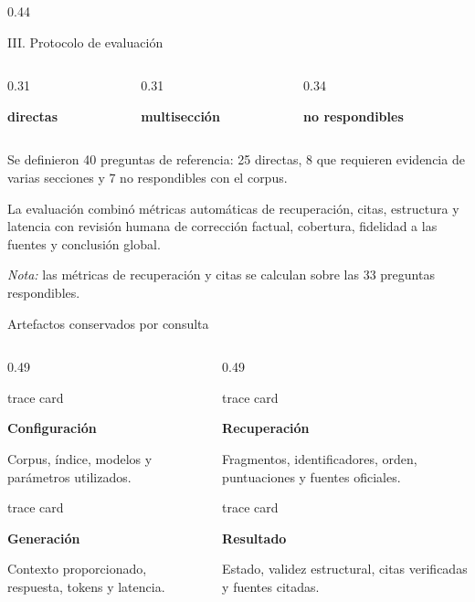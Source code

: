 \documentclass[final]{beamer}
\newcommand{\tracecard}[2]{%
  \begin{beamercolorbox}[wd=\linewidth,sep=0.42cm]{trace card}
    {\color{Navy}\bfseries\fontsize{25}{29}\selectfont #1\par}
    \vspace{0.12cm}
    {\fontsize{21}{25}\selectfont #2\par}
  \end{beamercolorbox}
}
\begin{document}
\begin{frame}[t]
\begin{columns}[T,totalwidth=\textwidth]
\begin{column}{0.44\textwidth}
\begin{block}{III. Protocolo de evaluación}
\begin{columns}[T,totalwidth=\linewidth]
  \begin{column}{0.31\linewidth}
    \centering
    {\color{Teal}\bfseries\fontsize{46}{49}\par}
    {\bfseries\fontsize{23}{27}\selectfont directas}
  \end{column}
  \begin{column}{0.31\linewidth}
    \centering
    {\color{Teal}\bfseries\fontsize{46}{49}\par}
    {\bfseries\fontsize{23}{27}\selectfont multisección}
  \end{column}
  \begin{column}{0.34\linewidth}
    \centering
    {\color{Teal}\bfseries\fontsize{46}{49}\par}
    {\bfseries\fontsize{23}{27}\selectfont no respondibles}
  \end{column}
\end{columns}

\vspace{0.50cm}
Se definieron 40 preguntas de referencia: 25 directas, 8 que requieren
evidencia de varias secciones y 7 no respondibles con el corpus.

\vspace{0.30cm}
La evaluación combinó métricas automáticas de recuperación, citas, estructura
y latencia con revisión humana de corrección factual, cobertura, fidelidad a
las fuentes y conclusión global.

\vspace{0.25cm}
{\fontsize{22}{27}\selectfont\textit{Nota:} las métricas de recuperación y
citas se calculan sobre las 33 preguntas respondibles.\par}
\end{block}

\begin{block}{Artefactos conservados por consulta}
\begin{columns}[T,totalwidth=\linewidth]
  \begin{column}{0.49\linewidth}
    \tracecard{Configuración}{Corpus, índice, modelos y parámetros utilizados.}
    \vspace{0.24cm}
    \tracecard{Generación}{Contexto proporcionado, respuesta, tokens y
    latencia.}
  \end{column}
  \begin{column}{0.49\linewidth}
    \tracecard{Recuperación}{Fragmentos, identificadores, orden, puntuaciones y
    fuentes oficiales.}
    \vspace{0.24cm}
    \tracecard{Resultado}{Estado, validez estructural, citas verificadas y
    fuentes citadas.}
  \end{column}
\end{columns}


\end{block}
\end{column}
\end{columns}
\end{frame}
\end{document}
